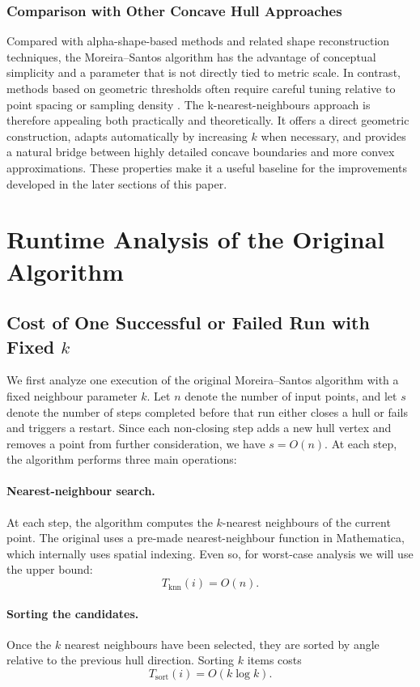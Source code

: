 \documentclass[10pt,twocolumn]{article}
\begin{document}
\subsubsection{Comparison with Other Concave Hull Approaches}
Compared with alpha-shape-based methods and related shape reconstruction techniques, the Moreira--Santos algorithm has the advantage of conceptual simplicity and a parameter that is not directly tied to metric scale. In contrast, methods based on geometric thresholds often require careful tuning relative to point spacing or sampling density \citep{edelsbrunner1983, liao2021}.
The k-nearest-neighbours approach is therefore appealing both practically and theoretically. It offers a direct geometric construction, adapts automatically by increasing $k$ when necessary, and provides a natural bridge between highly detailed concave boundaries and more convex approximations. These properties make it a useful baseline for the improvements developed in the later sections of this paper.
\section{Runtime Analysis of the Original Algorithm}
\subsection{Cost of One Successful or Failed Run with Fixed $k$}
We first analyze one execution of the original Moreira--Santos algorithm with a fixed neighbour parameter $k$. Let $n$ denote the number of input points, and let $s$ denote the number of steps completed before that run either closes a hull or fails and triggers a restart. Since each non-closing step adds a new hull vertex and removes a point from further consideration, we have $s = O(n)$.
At each step, the algorithm performs three main operations:
\paragraph{Nearest-neighbour search.}
At each step, the algorithm computes the $k$-nearest neighbours of the current point. The original uses a pre-made nearest-neighbour function in Mathematica, which internally uses spatial indexing. Even so, for worst-case analysis we will use the upper bound:
\[
T_{\mathrm{knn}}(i)=O(n).
\]
\paragraph{Sorting the candidates.}
Once the $k$ nearest neighbours have been selected, they are sorted by angle relative to the previous hull direction. Sorting $k$ items costs
\[
T_{\mathrm{sort}}(i)=O(k\log k).
\]
\end{document}
